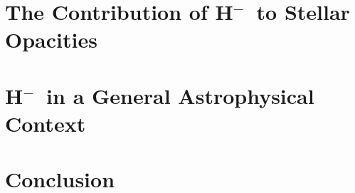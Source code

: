 \documentclass{emulateapj}
\def\h{H$^-$}
\begin{document}
\section{The Contribution of \h\ to Stellar Opacities}



\section{\h\ in a General Astrophysical Context}


\pagebreak
\section{Conclusion}





\end{document}
